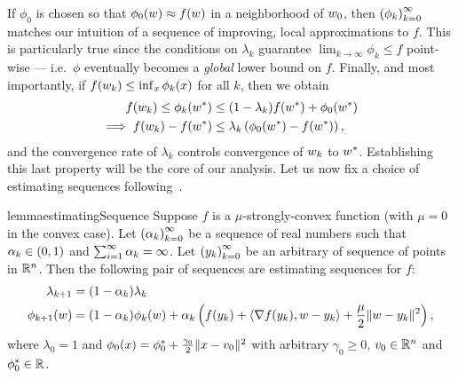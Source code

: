 If \( \phi_0 \) is chosen so that \( \phi_0(w) \approx f(w) \) in a neighborhood of \( w_0 \), then \( \left(\phi_k\right)_{k=0}^\infty \) matches our intuition of a sequence of improving, local approximations to \( f \).
This is particularly true since the conditions on \( \lambda_k \) guarantee \( \lim_{k \rightarrow \infty} \phi_k \leq f \) point-wise --- i.e.\ \( \phi \) eventually becomes a \emph{global} lower bound on \( f \).
Finally, and most importantly, if \( f(w_k) \leq \inf_x \phi_k(x) \) for all \( k \), then we obtain
\begin{align*}
    f(w_k) \leq \phi_k(w^*) &\leq (1 - \lambda_k) f(w^*) + \phi_0(w^*)\\
    \implies f(w_k) - f(w^*) &\leq \lambda_k \left(\phi_0(w^*) - f(w^*)\right),
\end{align*}
and the convergence rate of \( \lambda_k \) controls convergence of \( w_k \) to \( w^* \).
Establishing this last property will be the core of our analysis.
Let us now fix a choice of estimating sequences following~\citet[Lemma 2.2.2]{nesterov2004lectures}. 

\newpage

\begin{restatable}{lemma}{estimatingSequence}\label{lemma:estimating-sequence}
    Suppose \( f \) is a \( \mu \)-strongly-convex function (with \( \mu = 0 \) in the convex case).
    Let \( \left(\alpha_{k}\right)_{k=0}^\infty \) be a sequence of real numbers such that \( \alpha_{k} \in (0,1) \) and \( \sum_{i=1}^\infty \alpha_{k} = \infty \). 
    Let \( \left(y_k\right)_{k=0}^\infty \) be an arbitrary of sequence of points in \( \mathbb{R}^n \).
    Then the following pair of sequences are estimating sequences for \( f \):
    \begin{align*}
        \lambda_{k+1} &= (1- \alpha_k) \lambda_k\\
        \phi_{k+1}(w) &= (1-\alpha_k) \phi_k(w) + \alpha_k \left(f(y_k) + \left\langle\nabla f(y_k), w - y_k\right\rangle + \frac{\mu}{2} \|w - y_k\|^2\right),
    \end{align*}
    where \( \lambda_0 = 1 \) and \( \phi_0(x) = \phi_0^* + \frac{\gamma_0}{2}\|x - v_0\|^2 \) with arbitrary \( \gamma_0 \geq 0 \), \( v_0 \in \mathbb{R}^n \) and \( \phi_0^* \in \mathbb{R} \).
\end{restatable}

